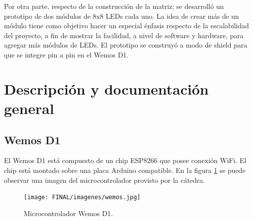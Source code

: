     Por otra parte, respecto de la construcción de la matriz; se desarrolló un prototipo de dos módulos de 8x8 LEDs cada uno. La idea de crear más de un módulo tiene como objetivo hacer un especial énfasis respecto de la escalabilidad del proyecto, a fin de mostrar la facilidad, a nivel de software y hardware, para agregar más módulos de LEDs. El prototipo se construyó a modo de shield para que se integre pin a pin en el Wemos D1.
    
    
    

\section{Descripción y documentación general}


    \subsection{Wemos D1} \label{sec:Wemosd1}
    El Wemos D1 está compuesto de un chip ESP8266 que posee conexión WiFi. El chip está montado sobre una placa Arduino compatible. En la figura \ref{fig:Wemos-plaqueta} se puede observar una imagen del microcontrolador provisto por la cátedra.
    
    \begin{figure}[ht!]
        \centering
        \begin{center}
            \texttt{[image: FINAL/imagenes/wemos.jpg]}
            \caption{Microcontrolador Wemos D1.}
            \label{fig:Wemos-plaqueta}
        \end{center}
    \end{figure}
    
